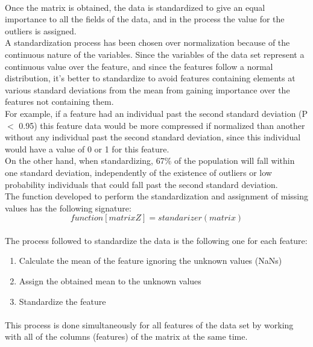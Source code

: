 \documentclass[12pt, a4paper]{article}
\begin{document}
\paragraph{}Once the matrix is obtained, the data is standardized to give an equal importance to all the fields of the data, and in the process the value for the outliers is assigned.\\

A standardization process has been chosen over normalization because of the continuous nature of the variables. Since the variables of the data set represent a continuous value over the feature, and since the features follow a normal distribution, it's better to standardize to avoid features containing elements at various standard deviations from the mean from gaining importance over the features not containing them.\\

For example, if a feature had an individual past the second standard deviation (P $<$ 0.95) this feature data would be more compressed if normalized than another without any individual past the second standard deviation, since this individual would have a value of 0 or 1 for this feature.\\

On the other hand, when standardizing, 67\% of the population will fall within one standard deviation, independently of the existence of outliers or low probability individuals that could fall past the second standard deviation.\\

The function developed to perform the standardization and assignment of missing values has the following signature:
\[
	function[matrixZ] = standarizer(matrix)
\]

\paragraph{}The process followed to standardize the data is the following one for each feature:
\begin{enumerate}
	\item Calculate the mean of the feature ignoring the unknown values (NaNs)
	\item Assign the obtained mean to the unknown values
	\item Standardize the feature
\end{enumerate}
\paragraph{}This process is done simultaneously for all features of the data set by working with all of the columns (features) of the matrix at the same time.
\end{document}
